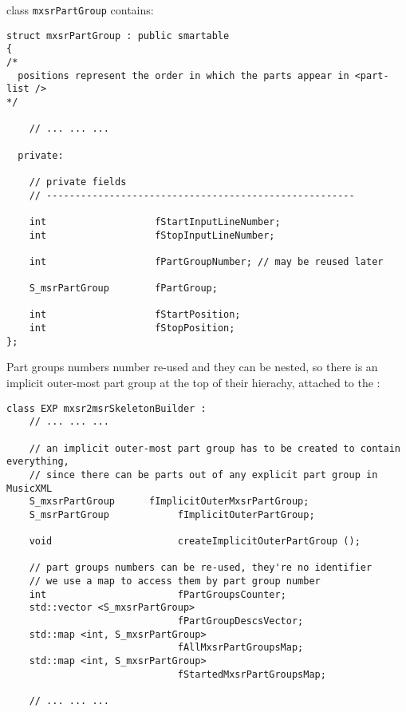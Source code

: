 class   {\tt mxsrPartGroup} contains:
\begin{lstlisting}[language=CPlusPlus]
struct mxsrPartGroup : public smartable
{
/*
  positions represent the order in which the parts appear in <part-list />
*/

	// ... ... ...

  private:

    // private fields
    // ------------------------------------------------------

    int                   fStartInputLineNumber;
    int                   fStopInputLineNumber;

    int                   fPartGroupNumber; // may be reused later

    S_msrPartGroup        fPartGroup;

    int                   fStartPosition;
    int                   fStopPosition;
};
\end{lstlisting}

Part groups numbers number re-used and they can be nested, so there is an implicit outer-most part group at the top of their hierachy, attached to the :
\begin{lstlisting}[language=CPlusPlus]
class EXP mxsr2msrSkeletonBuilder :
	// ... ... ...

    // an implicit outer-most part group has to be created to contain everything,
    // since there can be parts out of any explicit part group in MusicXML
    S_mxsrPartGroup      fImplicitOuterMxsrPartGroup;
    S_msrPartGroup            fImplicitOuterPartGroup;

    void                      createImplicitOuterPartGroup ();

    // part groups numbers can be re-used, they're no identifier
    // we use a map to access them by part group number
    int                       fPartGroupsCounter;
    std::vector <S_mxsrPartGroup>
                              fPartGroupDescsVector;
    std::map <int, S_mxsrPartGroup>
                              fAllMxsrPartGroupsMap;
    std::map <int, S_mxsrPartGroup>
                              fStartedMxsrPartGroupsMap;

	// ... ... ...
\end{lstlisting}

